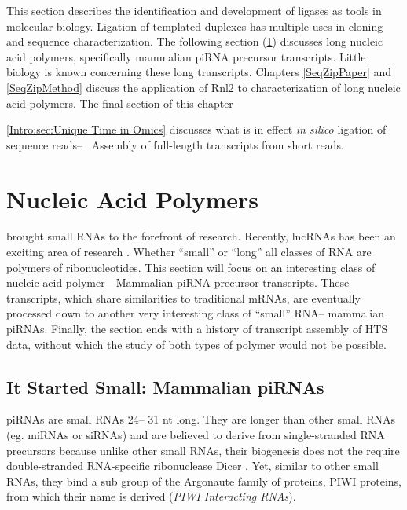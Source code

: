     This section describes the identification and development of ligases as tools in molecular biology. Ligation of templated duplexes has multiple uses in cloning and sequence characterization. The following section (\ref{Intro:sec:Nucleic Acid Polymers}) discusses long nucleic acid polymers, specifically mammalian piRNA precursor transcripts. Little biology is known concerning these long transcripts. Chapters \ref{SeqZipPaper} and \ref{SeqZipMethod} discuss the application of Rnl2 to characterization of long nucleic acid polymers. The final section of this chapter {\ref{Intro:sec:Unique Time in Omics} discusses what is in effect \textit{in silico} ligation of sequence reads--~ Assembly of full-length transcripts from short reads.

\section{Nucleic Acid Polymers}
  \label{Intro:sec:Nucleic Acid Polymers}

  \citet{Fire1998} brought small RNAs to the forefront of research. Recently, lncRNAs has been an exciting area of research \citep{Khalil2009,Guttman2009}. Whether ``small'' or ``long'' all classes of RNA are polymers of ribonucleotides. This section will focus on an interesting class of nucleic acid polymer---Mammalian piRNA precursor transcripts. These transcripts, which share similarities to traditional mRNAs, are eventually processed down to another very interesting class of ``small'' RNA-- mammalian piRNAs. Finally, the section ends with a history of transcript assembly of HTS data, without which the study of both types of polymer would not be possible.

  \subsection{It Started Small: Mammalian piRNAs}
  
    piRNAs are small RNAs 24-- 31 nt long. They are longer than other small RNAs (eg. miRNAs or siRNAs) and are believed to derive from single-stranded RNA precursors because unlike other small RNAs, their biogenesis does not the require double-stranded RNA-specific ribonuclease Dicer \citep{Vagin2006, Houwing2007}. Yet, similar to other small RNAs, they bind a sub group of the Argonaute family of proteins, PIWI proteins, from which their name is derived (\textit{PIWI Interacting RNAs}). 

}
